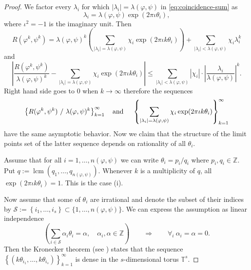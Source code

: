 \documentclass[12pt, a4paper]{amsart}
\def\Z{{\mathbb Z}}
\begin{document}
\begin{proof}
  We factor every $\lambda_i$ for which $|\lambda_i| = \lambda(\varphi, \psi)$
  in \eqref{eq:coincidence-sum} as
  $$\lambda_i = \lambda(\varphi, \psi) \exp(2\pi\iota\theta_i),$$
  where $\iota^2 = -1$ is the imaginary unit.
  Then
  \[
    R(\varphi^k, \psi^k) = \lambda(\varphi, \psi)^k
      \left( \sum_{|\lambda_i| = \lambda(\varphi, \psi)} \chi_i \exp(2\pi\iota k \theta_i) \right)
      + \sum_{|\lambda_i| < \lambda(\varphi, \psi)} \chi_i \lambda_i^k
  \]
  and
  \[
    \left| \frac{R(\varphi^k, \psi^k)}{\lambda(\varphi, \psi)^k}
      - \sum_{|\lambda_i| = \lambda(\varphi, \psi)} \chi_i \exp(2\pi\iota k \theta_i) \right|
    \leq \sum_{|\lambda_i| < \lambda(\varphi, \psi)} |\chi_i|
      \cdot \left| \frac{\lambda_i}{\lambda(\varphi, \psi)} \right|^k.
  \]
  Right hand side goes to $0$ when $k \to \infty$ therefore the sequences
  \[
    \left\{ R(\varphi^k, \psi^k) \ / \ \lambda(\varphi, \psi)^k \right\}_{k=1}^\infty
    \mbox{\quad and \quad }
    \left\{ \sum_{|\lambda_i| = \lambda(\varphi, \psi)} \chi_i \exp(2\pi\iota k \theta_i) \right\}_{k=1}^\infty
  \]
  have the same asymptotic behavior.
  Now we claim that the structure of the limit points set of the latter sequence
  depends on rationality of all $\theta_i$.

  Assume that for all $i = 1, \dots, n(\varphi, \psi)$ we can write $\theta_i = p_i / q_i$ where $p_i, q_i \in \Z$.
  Put $q := \operatorname{lcm}(q_1, \dots, q_{n(\varphi, \psi)})$.
  Whenever $k$ is a multiplicity of $q$, all $\exp(2\pi\iota k \theta_i) = 1$.
  This is the case (i).

  Now assume that some of $\theta_i$ are irrational and denote the subset of their indices
  by $\mathcal{S} := \left\{ i_1, \dots, i_s \right\} \subset \{1, \dots, n(\varphi, \psi)\}$.
  We can express the assumption as linear independence
  \[
    \left( \sum_{i \in \mathcal{S}} \alpha_i \theta_i = \alpha, \quad \alpha_i, \alpha \in \Z \right) \qquad
    \Longrightarrow \qquad \forall_i \ \alpha_i = \alpha = 0.
  \]
  Then the Kronecker theorem (see \cite[Theorem VIII.6]{Cha}) states that the sequence \linebreak
  $\left\{ (k\theta_{i_1}, \dots, k\theta_{i_s}) \right\}_{k=1}^\infty$ is dense
  in the $s$-dimensional torus $\mathbb{T}^s$.


\end{proof}
\end{document}
